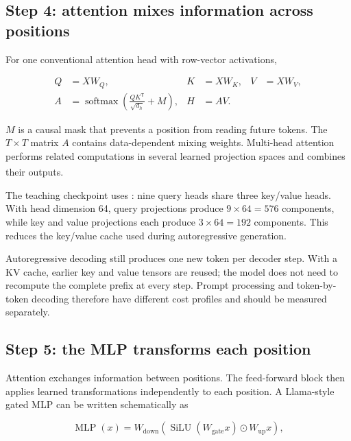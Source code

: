 \subsection{Step 4: attention mixes information across positions}

For one conventional attention head with row-vector activations,

\begin{align}
    Q &= XW_Q, & K &= XW_K, & V &= XW_V,
    \label{eq:qkv-projections}\\
    A &= \operatorname{softmax}\!\left(
        \frac{QK^{\mathsf T}}{\sqrt{d_h}} + M\right),
    & H &= AV.
    \label{eq:scaled-dot-product-attention}
\end{align}

$M$ is a causal mask that prevents a position from reading future tokens.
The $T\times T$ matrix $A$ contains data-dependent mixing weights.
Multi-head attention performs related computations in several learned
projection spaces and combines their
outputs.\textsuperscript{\cite{vaswaniAttentionAllYou2023}}

The teaching checkpoint uses : nine query
heads share three key/value heads.
With head dimension 64, query projections produce $9\times64=576$ components,
while key and value projections each produce $3\times64=192$ components.
This reduces the key/value cache used during autoregressive generation.

\begin{engineernote}
Autoregressive decoding still produces one new token per decoder step.
With a KV cache, earlier key and value tensors are reused; the model does not
need to recompute the complete prefix at every step.
Prompt processing and token-by-token decoding therefore have different cost
profiles and should be measured separately.
\end{engineernote}

\subsection{Step 5: the MLP transforms each position}

Attention exchanges information between positions.
The feed-forward block then applies learned transformations independently to
each position.
A Llama-style gated MLP can be written schematically as

\begin{equation}
    \operatorname{MLP}(x) =
    W_{\mathrm{down}}
    \left(\operatorname{SiLU}(W_{\mathrm{gate}}x)
    \odot W_{\mathrm{up}}x\right),
    \label{eq:gated-mlp}
\end{equation}

